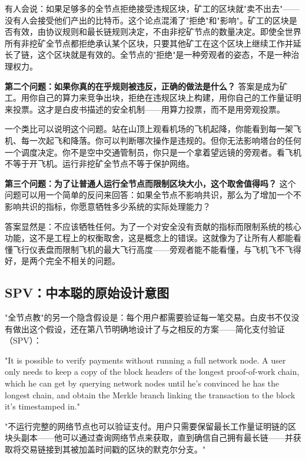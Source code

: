 \documentclass[a4paper,12pt,openany]{ctexbook}
\newenvironment{quoting}{%
  \par\vspace{0.5em}%
  \begin{list}{}{%
    \setlength{\leftmargin}{2em}%
    \setlength{\rightmargin}{2em}%
    \setlength{\parsep}{0.3em}%
    \setlength{\itemsep}{0pt}%
    \setlength{\topsep}{0pt}%
  }%
  \item\relax
}{%
  \end{list}%
  \par\vspace{0.5em}%
}
\begin{document}
有人会说：如果足够多的全节点拒绝接受违规区块，矿工的区块就"卖不出去"——没有人会接受他们产出的比特币。这个论点混淆了"拒绝"和"影响"。矿工的区块是否有效，由协议规则和最长链规则决定，不由非挖矿节点的数量决定。即使全世界所有非挖矿全节点都拒绝承认某个区块，只要其他矿工在这个区块上继续工作并延长了链，这个区块就是有效的。全节点的"拒绝"是一种旁观者的姿态，不是一种治理权力。

\textbf{第二个问题：如果你真的在乎规则被违反，正确的做法是什么？} 答案是成为矿工。用你自己的算力来竞争出块，拒绝在违规区块上构建，用你自己的工作量证明来投票。这才是白皮书描述的安全机制——用算力投票，而不是用旁观投票。

一个类比可以说明这个问题。站在山顶上观看机场的飞机起降，你能看到每一架飞机、每一次起飞和降落。你可以判断哪次操作是违规的。但你无法影响塔台的任何一个调度决定。你不是空中交通管制员，你只是一个拿着望远镜的旁观者。看飞机不等于开飞机。运行非挖矿全节点不等于保护网络。

\textbf{第三个问题：为了让普通人运行全节点而限制区块大小，这个取舍值得吗？} 这个问题可以用一个简单的反问来回答：如果全节点不影响共识，那么为了增加一个不影响共识的指标，你愿意牺牲多少系统的实际处理能力？

答案显然是：不应该牺牲任何。为了一个对安全没有贡献的指标而限制系统的核心功能，这不是工程上的权衡取舍，这是概念上的错误。这就像为了让所有人都能看懂飞行仪表盘而限制飞机的最大飞行高度——旁观者能不能看懂，与飞机飞不飞得好，是两个完全不相关的问题。


\subsection*{SPV：中本聪的原始设计意图}


"全节点教"的另一个隐含假设是：每个用户都需要验证每一笔交易。白皮书不仅没有做出这个假设，还在第八节明确地设计了与之相反的方案——简化支付验证（SPV）：


\begin{quoting}
\small
"It is possible to verify payments without running a full network node. A user only needs to keep a copy of the block headers of the longest proof-of-work chain, which he can get by querying network nodes until he's convinced he has the longest chain, and obtain the Merkle branch linking the transaction to the block it's timestamped in."

"不运行完整的网络节点也可以验证支付。用户只需要保留最长工作量证明链的区块头副本——他可以通过查询网络节点来获取，直到确信自己拥有最长链——并获取将交易链接到其被加盖时间戳的区块的默克尔分支。"
\end{quoting}
\end{document}
